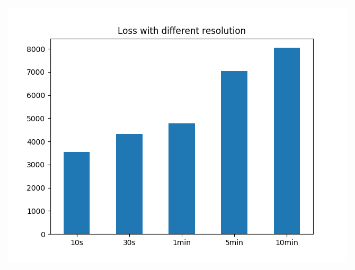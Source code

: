 \documentclass[aspectratio=169,11pt,hyperref={colorlinks=true}]{beamer}
\begin{document}
\begin{frame}
\begin{columns}
\begin{center}
\begin{figure}
          \includegraphics[width=0.8\textwidth,height=0.4\textheight]{graphs/loss_by_sampling-node_provider_all.png}
        \end{figure}
      \end{center}
  \end{columns}
\end{frame}
\end{document}
